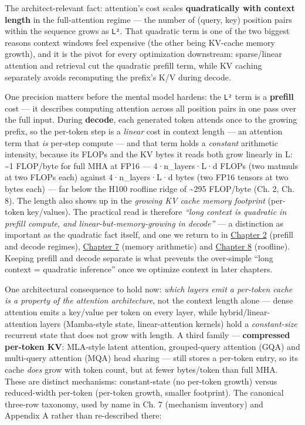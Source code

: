 The architect-relevant fact: attention's cost scales
\textbf{quadratically with context length} in the full-attention regime
--- the number of (query, key) position pairs within the sequence grows
as \texttt{L²}. That quadratic term is one of the two biggest reasons
context windows feel expensive (the other being KV-cache memory growth),
and it is the pivot for every optimization downstream: sparse/linear
attention and retrieval cut the quadratic prefill term, while KV caching
separately avoids recomputing the prefix's K/V during decode.

One precision matters before the mental model hardens: the \texttt{L²}
term is a \textbf{prefill} cost --- it describes computing attention
across all position pairs in one pass over the full input. During
\textbf{decode}, each generated token attends once to the growing
prefix, so the per-token step is a \emph{linear} cost in context length
--- an attention term that \emph{is} per-step compute --- and that term
holds a \emph{constant} arithmetic intensity, because its FLOPs and the
KV bytes it reads both grow linearly in L: \textasciitilde1 FLOP/byte
for full MHA at FP16 --- 4·n\_layers·L·d FLOPs (two matmuls at two FLOPs
each) against 4·n\_layers·L·d bytes (two FP16 tensors at two bytes each)
--- far below the H100 roofline ridge of \textasciitilde295 FLOP/byte
(Ch. 2, Ch. 8). The length also shows up in the \emph{growing KV cache
memory footprint} (per-token key/values). The practical read is
therefore \emph{``long context is quadratic in prefill compute, and
linear-but-memory-growing in decode''} --- a distinction as important as
the quadratic fact itself, and one we return to in \hyperref[chap:2]{Chapter 2} (prefill
and decode regimes), \hyperref[chap:7]{Chapter 7} (memory arithmetic) and \hyperref[chap:8]{Chapter 8}
(roofline). Keeping prefill and decode separate is what prevents the
over-simple ``long context = quadratic inference'' once we optimize
context in later chapters.

One architectural consequence to hold now: \emph{which layers emit a
per-token cache is a property of the attention architecture}, not the
context length alone --- dense attention emits a key/value per token on
every layer, while hybrid/linear-attention layers (Mamba-style state,
linear-attention kernels) hold a \emph{constant-size} recurrent state
that does not grow with length. A third family --- \textbf{compressed
per-token KV}: MLA-style latent attention, grouped-query attention (GQA)
and multi-query attention (MQA) head sharing --- still stores a
per-token entry, so its cache \emph{does} grow with token count, but at
fewer bytes/token than full MHA. These are distinct mechanisms:
constant-state (no per-token growth) versus reduced-width per-token
(per-token growth, smaller footprint). The canonical three-row taxonomy,
used by name in Ch. 7 (mechanism inventory) and Appendix A rather than
re-described there:

